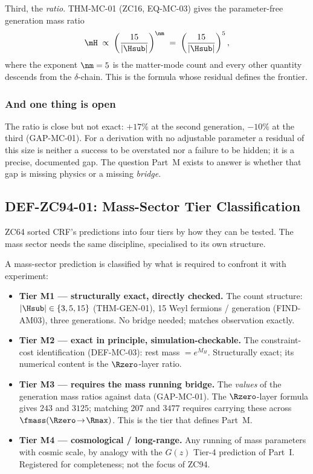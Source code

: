 \documentclass[12pt, a4paper]{article}
\begin{document}
Third, the \emph{ratio}. THM-MC-01 (ZC16, EQ-MC-03) gives the parameter-free
generation mass ratio
\[
  \mH \;\propto\; \left(\frac{15}{|\Hsub|}\right)^{\nm}
              \;=\; \left(\frac{15}{|\Hsub|}\right)^{5},
\]
where the exponent $\nm=5$ is the matter-mode count and every other quantity
descends from the $\delta$-chain. This is the formula whose residual defines
the frontier.

\subsubsection{And one thing is open}

The ratio is close but not exact: $+17\%$ at the second generation, $-10\%$ at
the third (GAP-MC-01). For a derivation with no adjustable parameter a residual
of this size is neither a success to be overstated nor a failure to be hidden;
it is a precise, documented gap. The question Part~M exists to answer is whether
that gap is missing physics or a missing \emph{bridge}.

\subsection{DEF-ZC94-01: Mass-Sector Tier Classification}
\label{sec:tiers-zc94}

ZC64 sorted CRF's predictions into four tiers by how they can be tested. The
mass sector needs the same discipline, specialised to its own structure.

\begin{formalbox}[title={DEF-ZC94-01: Mass-Sector Prediction Tiers (M1--M4)}]
A mass-sector prediction is classified by what is required to confront it with
experiment:
\begin{itemize}[leftmargin=1.6em, noitemsep]
  \item \textbf{Tier M1 --- structurally exact, directly checked.} The count
    structure: $|\Hsub|\in\{3,5,15\}$ (THM-GEN-01), 15 Weyl fermions /
    generation (FIND-AM03), three generations. No bridge needed; matches
    observation exactly.
  \item \textbf{Tier M2 --- exact in principle, simulation-checkable.} The
    constraint-cost identification (DEF-MC-03): rest mass $=e^{M_H}$.
    Structurally exact; its numerical content is the $\Rzero$-layer ratio.
  \item \textbf{Tier M3 --- requires the mass running bridge.} The
    \emph{values} of the generation mass ratios against data (GAP-MC-01). The
    $\Rzero$-layer formula gives $243$ and $3125$; matching $207$ and $3477$
    requires carrying these across $\fmass(\Rzero\!\to\!\Rmax)$. This is the
    tier that defines Part~M.
  \item \textbf{Tier M4 --- cosmological / long-range.} Any running of mass
    parameters with cosmic scale, by analogy with the $G(z)$ Tier-4 prediction
    of Part~I. Registered for completeness; not the focus of ZC94.
\end{itemize}
\end{formalbox}
\end{document}
